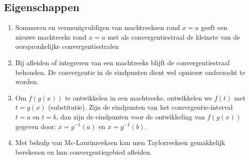 	\subsection{Eigenschappen}
	\begin{enumerate}
		\item Sommeren en vermenigvuldigen van machtreeksen rond $x = a$ geeft een nieuwe machtreeks rond $x = a$ met als convergentiestraal de kleinste van de oorspronkelijke convergentiestralen
		\item Bij afleiden of integreren van een machtreeks blijft de convergentiestraal behouden. De convergentie in de eindpunten dient wel opnieuw onderzocht te worden.
		\item Om $f(g(x))$ te ontwikkelen in een machtreeks, ontwikkelen we $f(t)$ met $t = g(x)$ (substitutie). Zijn de eindpunten van het convergentie-interval $t = a$ en $t = b$, dan zijn de eindpunten voor de ontwikkeling van $f(g(x))$ gegeven door: $x = g^{-1}(a)$ en $x = g^{-1}(b)$.

		\item Met behulp van Mc-Laurinreeksen kan men Taylorreeksen gemakkelijk berekenen en hun convergentiegebied afleiden.
	\end{enumerate}


